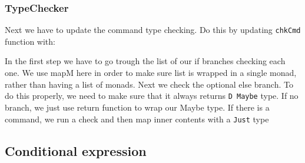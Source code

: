 \documentclass{article}
\begin{document}
\subsubsection{TypeChecker}
\begin{flushleft}
Next we have to update the command type checking. Do this by updating \texttt{chkCmd} function with:
\end{flushleft}
\begin{flushleft}
In the first step we have to go trough the list of our if branches checking each one. We use mapM here in order to make sure list is wrapped in a single monad, rather than having a list of monads. Next we check the optional else branch. To do this properly, we need to make sure that it always returns \texttt{D Maybe} type. If no branch, we just use return function to wrap our Maybe type. If there is a command, we run a check and then map inner contents with a \texttt{Just} type
\end{flushleft}

\subsection{Conditional expression}
\end{document}
